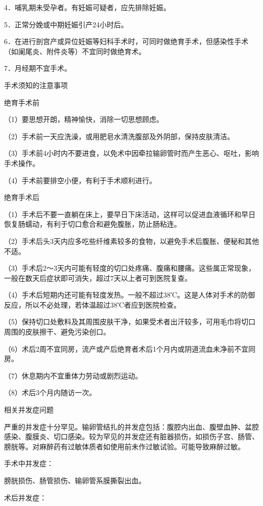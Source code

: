 \documentclass[12pt,UTF8,openany]{ctexbook}
\begin{document}
4．哺乳期未受孕者。有妊娠可疑者，应先排除妊娠。

5．正常分娩或中期妊娠引产24小时后。

6．在进行剖宫产或异位妊娠等妇科手术时，可同时做绝育手术，但感染性手术（如阑尾炎、附件炎等）不宜同时做绝育术。

7．月经期不宜手术。





手术须知的注意事项


绝育手术前

（1）要思想开朗，精神愉快，消除一切思想顾虑。

（2）手术前一天应洗澡，或用肥皂水清洗腹部及外阴部，保持皮肤清洁。

（3）手术前4小时内不要进食，以免术中因牵拉输卵管时而产生恶心、呕吐，影响手术操作。

（4）手术前要排空小便，有利于手术顺利进行。

绝育手术后

（1）手术后不要一直躺在床上，要早日下床活动，这样可以促进血液循环和早日恢复肠蠕动，有利于切口愈合和避免腹胀，防止肠粘连。

（2）手术后头3天内应多吃些纤维素较多的食物，以避免手术后腹胀、便秘和其他不适。

（3）手术后2～3天内可能有轻度的切口处疼痛、腹痛和腰痛。这些属正常现象，一般在数天后症状即可消失，超过7天以上者可到医院复查。

（4）手术后短期内还可能有轻度发热。一般不超过38℃。这是人体对手术的防御反应，所以不必处理，若体温超过38℃者应到医院检查。

（5）保持切口处敷料及其周围皮肤干净，如果受术者出汗较多，可用毛巾将切口周围的皮肤擦干、避免污染创口。

（6）术后2周不宜同房，流产或产后绝育者术后1个月内或阴道流血未净前不宜同房。

（7）休息期内不宜重体力劳动或剧烈运动。

（8）术后3个月内随访一次。





相关并发症问题


严重的并发症十分罕见。输卵管结扎的并发症包括：腹腔内出血、腹壁血肿、盆腔感染、腹膜炎、切口感染。较为罕见的并发症还有脏器损伤，如损伤子宫、肠管、膀胱等。对麻醉药有过敏体质者如使用前未作过敏试验。可能导致麻醉过敏。

手术中并发症：

膀胱损伤、肠管损伤、输卵管系膜撕裂出血。

术后并发症：
\end{document}
